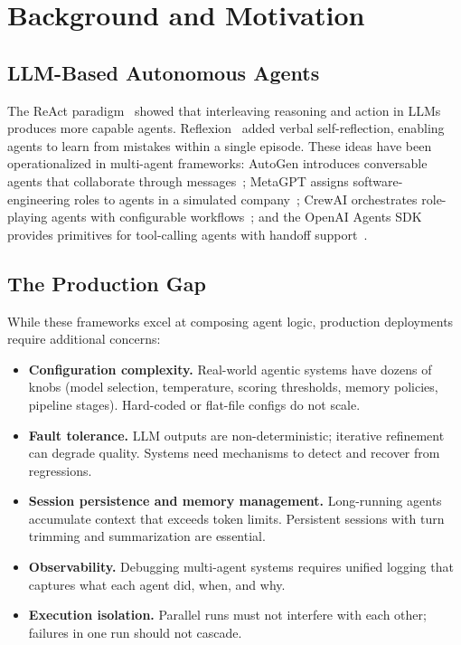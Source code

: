 \documentclass[11pt, a4paper]{article}
\begin{document}
\section{Background and Motivation}
\label{sec:background}

\subsection{LLM-Based Autonomous Agents}

The ReAct paradigm~\cite{yao2023react} showed that interleaving
reasoning and action in LLMs produces more capable agents.
Reflexion~\cite{shinn2023reflexion} added verbal self-reflection,
enabling agents to learn from mistakes within a single episode.  These
ideas have been operationalized in multi-agent frameworks: AutoGen
introduces conversable agents that collaborate through
messages~\cite{wu2023autogen}; MetaGPT assigns software-engineering
roles to agents in a simulated company~\cite{hong2023metagpt}; CrewAI
orchestrates role-playing agents with configurable
workflows~\cite{crewai2024}; and the OpenAI Agents SDK provides
primitives for tool-calling agents with handoff
support~\cite{openaiagentssdk2025}.

\subsection{The Production Gap}

While these frameworks excel at composing agent logic, production
deployments require additional concerns:
\begin{itemize}[leftmargin=*]
  \item \textbf{Configuration complexity.}  Real-world agentic systems
    have dozens of knobs (model selection, temperature, scoring
    thresholds, memory policies, pipeline stages).  Hard-coded or
    flat-file configs do not scale.
  \item \textbf{Fault tolerance.}  LLM outputs are non-deterministic;
    iterative refinement can degrade quality.  Systems need mechanisms
    to detect and recover from regressions.
  \item \textbf{Session persistence and memory management.}  Long-running
    agents accumulate context that exceeds token limits.  Persistent
    sessions with turn trimming and summarization are essential.
  \item \textbf{Observability.}  Debugging multi-agent systems requires
    unified logging that captures what each agent did, when, and why.
  \item \textbf{Execution isolation.}  Parallel runs must not interfere
    with each other; failures in one run should not cascade.
\end{itemize}
\end{document}
